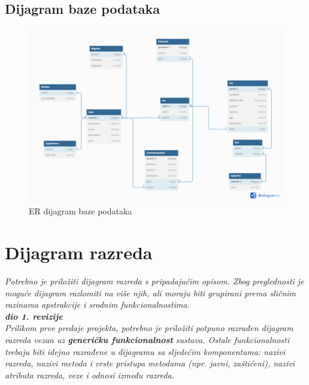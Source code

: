 			\subsection{Dijagram baze podataka}
				\begin{figure}
					\centering
					\includegraphics[width=0.8\linewidth]{ERbaza.png}
					\caption{ER dijagram baze podataka}
					\label{fig:your_label}
				\end{figure}
			
			\eject
			
			
		\section{Dijagram razreda}
		
			\textit{Potrebno je priložiti dijagram razreda s pripadajućim opisom. Zbog preglednosti je moguće dijagram razlomiti na više njih, ali moraju biti grupirani prema sličnim razinama apstrakcije i srodnim funkcionalnostima.}\\
			
			\textbf{\textit{dio 1. revizije}}\\
			
			\textit{Prilikom prve predaje projekta, potrebno je priložiti potpuno razrađen dijagram razreda vezan uz \textbf{generičku funkcionalnost} sustava. Ostale funkcionalnosti trebaju biti idejno razrađene u dijagramu sa sljedećim komponentama: nazivi razreda, nazivi metoda i vrste pristupa metodama (npr. javni, zaštićeni), nazivi atributa razreda, veze i odnosi između razreda.}\\
			
